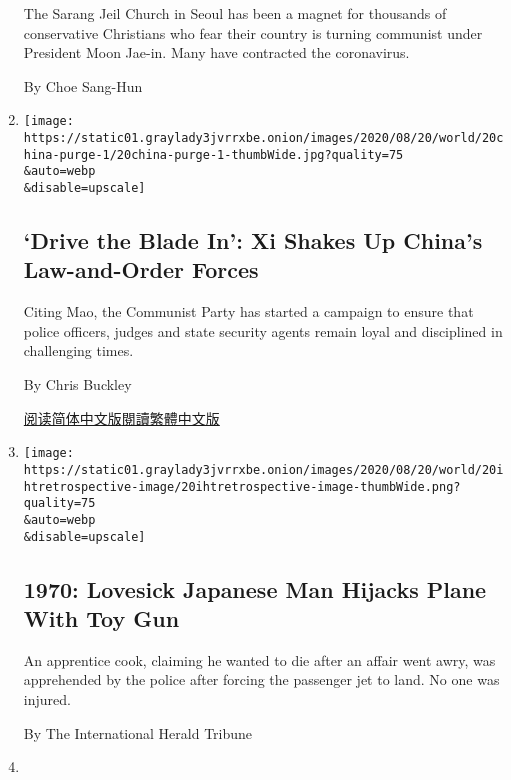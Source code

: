 \begin{enumerate}
  The Sarang Jeil Church in Seoul has been a magnet for thousands of
  conservative Christians who fear their country is turning communist
  under President Moon Jae-in. Many have contracted the coronavirus.

  By Choe Sang-Hun
\item
  \href{/2020/08/20/world/asia/china-xi-jinping-communist-party.html}{}

  \texttt{[image: https://static01.graylady3jvrrxbe.onion/images/2020/08/20/world/20china-purge-1/20china-purge-1-thumbWide.jpg?quality=75\\\&auto=webp\\\&disable=upscale]}

  \hypertarget{drive-the-blade-in-xi-shakes-up-chinas-law-and-order-forces}{%
  \subsection{`Drive the Blade In': Xi Shakes Up China's Law-and-Order
  Forces}\label{drive-the-blade-in-xi-shakes-up-chinas-law-and-order-forces}}

  Citing Mao, the Communist Party has started a campaign to ensure that
  police officers, judges and state security agents remain loyal and
  disciplined in challenging times.

  By Chris Buckley

  \href{https://cn.nytimes3xbfgragh.onion/china/20200821/china-xi-jinping-communist-party/}{阅读简体中文版}\href{https://cn.nytimes3xbfgragh.onion/china/20200821/china-xi-jinping-communist-party/zh-hant/}{閱讀繁體中文版}
\item
  \href{/2020/08/20/world/asia/1970-man-hijacks-plane.html}{}

  \texttt{[image: https://static01.graylady3jvrrxbe.onion/images/2020/08/20/world/20ihtretrospective-image/20ihtretrospective-image-thumbWide.png?quality=75\\\&auto=webp\\\&disable=upscale]}

  \hypertarget{1970-lovesick-japanese-man-hijacks-plane-with-toy-gun}{%
  \subsection{1970: Lovesick Japanese Man Hijacks Plane With Toy
  Gun}\label{1970-lovesick-japanese-man-hijacks-plane-with-toy-gun}}

  An apprentice cook, claiming he wanted to die after an affair went
  awry, was apprehended by the police after forcing the passenger jet to
  land. No one was injured.

  By The International Herald Tribune
\item
  \href{/2020/08/20/world/asia/india-police-brutality.html}{}


\end{enumerate}
